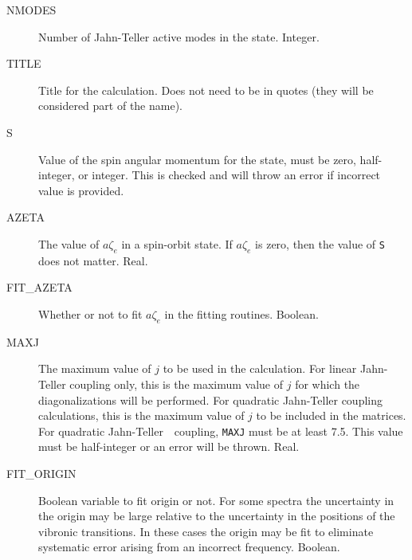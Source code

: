 \documentclass{article}
\newcommand{\JT}{Jahn-Teller\ }
\begin{document}
\begin{description}

\item[NMODES] Number of Jahn-Teller active modes in the state. Integer.

\item[TITLE] Title for the calculation. Does not need to be in quotes (they will be considered part of
  the name). 

\item[S] Value of the spin angular momentum for the state, must be
  zero, half-integer, or integer. This is checked and will throw an error if incorrect value is provided.

\item[AZETA] The value of $a\zeta _e$ in a spin-orbit state. If
  $a\zeta_e$ is zero, then the value of {\tt S} does not matter. Real.

\item[FIT\_AZETA] Whether or not to fit $a\zeta _e$ in the fitting
  routines. Boolean.


\item[MAXJ] The maximum value of $j$ to be used in the
  calculation. For linear Jahn-Teller coupling only, this is the
  maximum value of $j$ for which the diagonalizations will be
  performed. For quadratic Jahn-Teller coupling calculations, this is
  the maximum value of $j$ to be included in the matrices. For
  quadratic \JT\ coupling, {\tt MAXJ} must be at least 7.5. This value
  must be half-integer or an error will be thrown. Real.

  \item[FIT\_ORIGIN] Boolean variable to fit origin or not. For some spectra the uncertainty in the origin may be large relative to the uncertainty in the positions of the vibronic transitions. In these cases the origin may be fit to eliminate systematic error arising from an incorrect frequency. Boolean.
  

\end{description}
\end{document}
